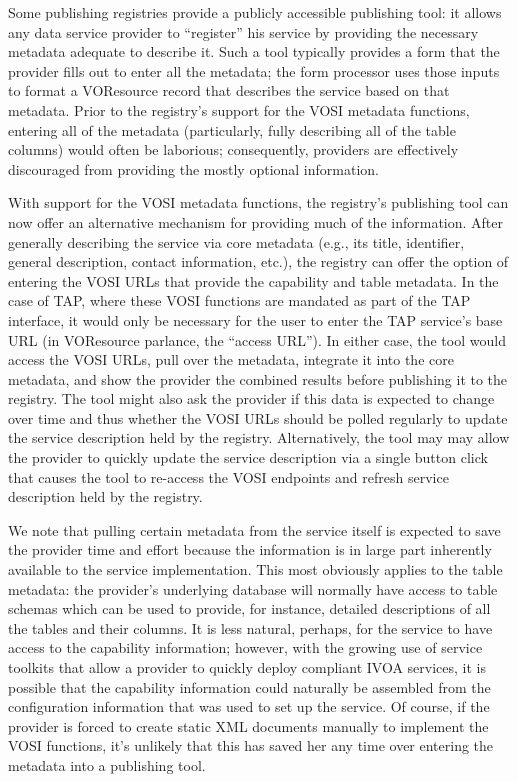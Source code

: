\documentclass[11pt,letter]{ivoa}
\begin{document}
Some publishing registries \citep{2018ivoa.spec.0723D} provide a
publicly accessible publishing tool: it allows any data service provider
to ``register'' his service by providing the necessary metadata adequate
to describe it. Such a tool typically provides a form that the provider
fills out to enter all the metadata; the form processor uses those
inputs to format a VOResource record that describes the service based on
that metadata. Prior to the registry's support for the VOSI metadata
functions, entering all of the metadata (particularly, fully describing
all of the table columns) would often be laborious; consequently,
providers are effectively discouraged from providing the mostly optional
information.

With support for the VOSI metadata functions, the registry's publishing
tool can now offer an alternative mechanism for providing much of the
information. After generally describing the service via core metadata
(e.g., its title, identifier, general description, contact information,
etc.), the registry can offer the option of entering the VOSI URLs that
provide the capability and table metadata. In the case of TAP, where
these VOSI functions are mandated as part of the TAP interface, it would
only be necessary for the user to enter the TAP service's base URL (in
VOResource parlance, the ``access URL''). In either case, the tool would
access the VOSI URLs, pull over the metadata, integrate it into the core
metadata, and show the provider the combined results before publishing
it to the registry. The tool might also ask the provider if this data is
expected to change over time and thus whether the VOSI URLs should be
polled regularly to update the service description held by the registry.
Alternatively, the tool may may allow the provider to quickly update the
service description via a single button click that causes the tool to
re-access the VOSI endpoints and refresh service description held by the
registry.

We note that pulling certain metadata from the service itself is
expected to save the provider time and effort because the information is
in large part inherently available to the service implementation. This
most obviously applies to the table metadata: the provider's underlying
database will normally have access to table schemas which can be used to
provide, for instance, detailed descriptions of all the tables and their
columns. It is less natural, perhaps, for the service to have access to
the capability information; however, with the growing use of service
toolkits that allow a provider to quickly deploy compliant IVOA
services, it is possible that the capability information could naturally
be assembled from the configuration information that was used to set up
the service. Of course, if the provider is forced to create static XML
documents manually to implement the VOSI functions, it's unlikely that
this has saved her any time over entering the metadata into a publishing
tool.
\end{document}
